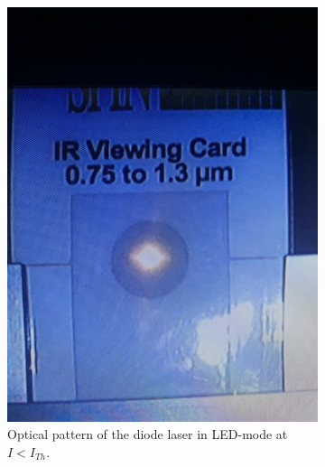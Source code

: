         \begin{figure}[!ht]%
            \begin{subfigure}{0.46\textwidth}%
              \centering%
              \includegraphics[scale=0.2]{pictures/Spot1.jpg}%
              \caption{Optical pattern of the diode laser in LED-mode at $I<I_{Th}$.}%
              \label{fig:Spot1}%
            \end{subfigure}%
            \hfill%
            \begin{subfigure}{0.46\textwidth}%
              \centering%

\end{subfigure}
\end{figure}
